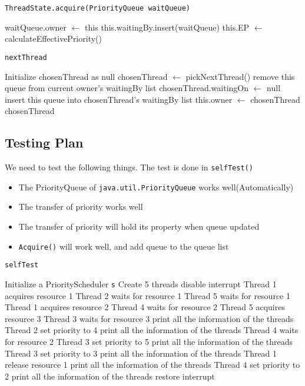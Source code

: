 \documentclass{article}
\begin{document}
\begin{spacing}{1.1}
\begin{algorithm}[htbp]
  \caption{\texttt{ThreadState.acquire(PriorityQueue waitQueue)}}
\begin{algorithmic}[1]
  \State waitQueue.owner $\leftarrow$ this
  \State this.waitingBy.insert(waitQueue)
  \State this.EP $\leftarrow$ calculateEffectivePriority()  
\Return
\end{algorithmic}
\end{algorithm}

\begin{algorithm}[htbp]
  \caption{\texttt{nextThread}}
\begin{algorithmic}[1]
  \State Initialize chosenThread as null
  \State chosenThread $\leftarrow$ pickNextThread()
    \State remove this queue from current owner's waitingBy list
    \State chosenThread.waitingOn $\leftarrow$ null
    \State insert this queue into chosenThread's waitingBy list
  \EndIf
  \State this.owner $\leftarrow$ chosenThread
\Return chosenThread
\end{algorithmic}
\end{algorithm}

\subsection{Testing Plan}
We need to test the following things. The test is done in \texttt{selfTest()}
\begin{itemize}
\item The PriorityQueue of \texttt{java.util.PriorityQueue} works well(Automatically)
\item The transfer of priority works well
\item The transfer of priority will hold its property when queue updated
\item \texttt{Acquire()} will work well, and add queue to the queue list
\end{itemize}

\begin{algorithm}[htbp]
  \caption{\texttt{selfTest}}
\begin{algorithmic}[1]
  \State Initialize a PriorityScheduler \texttt{s}
  \State Create 5 threads
  \State disable interrupt
  \State
  \State Thread 1 acquires resource 1
  \State Thread 2 waits for resource 1
  \State Thread 5 waits for resource 1
  \State Thread 1 acquires resource 2
  \State Thread 4 waits for resource 2
  \State Thread 5 acquires resource 3
  \State Thread 3 waits for resource 3
  \State print all the information of the threads
  \State
  \State Thread 2 set priority to 4
  \State print all the information of the threads
  \State
  \State Thread 4 waits for resource 2
  \State Thread 3 set priority to 5
  \State print all the information of the threads
  \State
  \State Thread 3 set priority to 3
  \State print all the information of the threads
  \State
  \State Thread 1 release resource 1
  \State print all the information of the threads
  \State
  \State Thread 4 set priority to 2
  \State print all the information of the threads
  \State
  \State restore interrupt
\end{algorithmic}
\end{algorithm}



\end{spacing}
\end{document}
